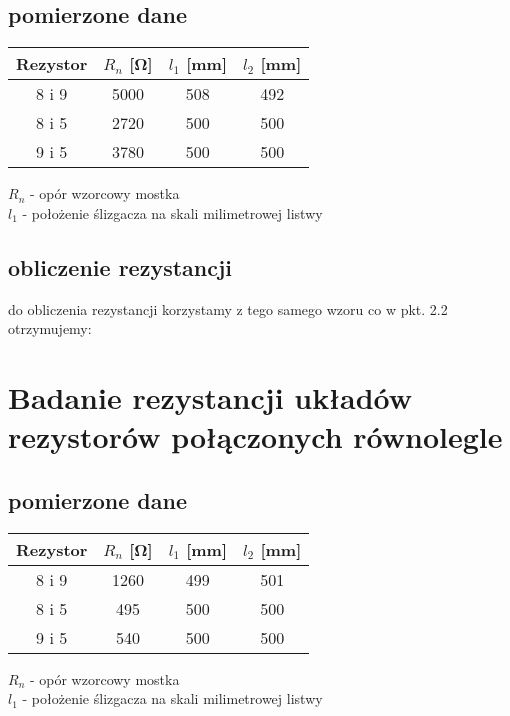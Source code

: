 \documentclass{article}
\begin{document}
\subsection{pomierzone dane}
\begin{center}
\begin{tabular}{ c |  c | c | c}
Rezystor & $R_n$ [\si{\ohm}] & $l_1$ [mm] & $l_2$ [mm]\\
\hline
 8 i 9 & 5000 & 508 & 492\\ 
 8 i 5 & 2720 & 500 & 500\\ 
 9 i 5 & 3780 & 500 & 500\\ 

\end{tabular}
\end{center}
$R_n$ - opór wzorcowy mostka\\ 
$l_1$ - położenie ślizgacza na skali milimetrowej listwy\\

\subsection{obliczenie rezystancji}
do obliczenia rezystancji korzystamy z tego samego wzoru co w pkt. 2.2\\
otrzymujemy: \\


\section{Badanie rezystancji układów rezystorów połączonych równolegle}
\subsection{pomierzone dane}
\begin{center}
\begin{tabular}{ c |  c | c | c}
Rezystor & $R_n$ [\si{\ohm}] & $l_1$ [mm] & $l_2$ [mm]\\
\hline
 8 i 9 & 1260 & 499 & 501\\ 
 8 i 5 & 495 & 500 & 500\\ 
 9 i 5 & 540 & 500 & 500\\ 

\end{tabular}
\end{center}
$R_n$ - opór wzorcowy mostka\\ 
$l_1$ - położenie ślizgacza na skali milimetrowej listwy\\
\end{document}

